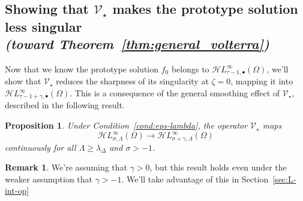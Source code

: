 \documentclass{article}
\theoremstyle{definition}
\newtheorem{rmk}{Remark}
\theoremstyle{plain}
\newtheorem{prop}{Proposition}
\newcommand{\singexp}[2]{\mathcal{H}L^\infty_{#1, #2}}
\newcommand{\singexpalg}[1]{\singexp{#1}{\bullet}}
\newcommand{\softpart}{\mathcal{V}_\star}
\newcommand{\solproto}{f_0}
\newcommand{\domain}{\Omega}
\begin{document}
\subsection{Showing that $\softpart$ makes the prototype solution less singular \\ \textit{(toward Theorem~\ref{thm:general_volterra})}}\label{sec:image under soft_part}
Now that we know the prototype solution $\solproto$ belongs to $\singexpalg{\tau-1}(\domain)$, we'll show that $\softpart$ reduces the sharpness of its singularity at $\zeta = 0$, mapping it into $\singexpalg{\tau-1+\gamma}(\domain)$. This is a consequence of the general smoothing effect of $\softpart$, described in the following result.

\begin{prop}\label{prop:smoothing}
Under {\em Condition~\eqref{cond:eps-lambda}}, the operator $\softpart$ maps
\[ \singexp{\sigma}{\Lambda}(\Omega) \to \singexp{\sigma+\gamma}{\Lambda}(\Omega) \]
continuously for all $\Lambda\geq \lambda_{\Delta}$ and $\sigma>-1$.
\end{prop}
\begin{rmk}
We're assuming that $\gamma > 0$, but this result holds even under the weaker assumption that $\gamma > -1$. We'll take advantage of this in Section~\ref{sec:L-int-op}
\end{rmk}
\end{document}
